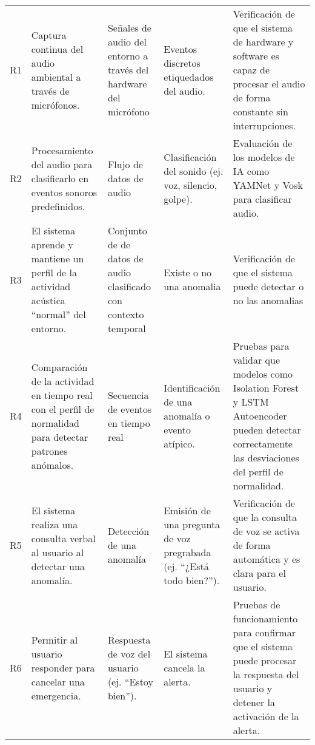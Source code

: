 {\begin{longtable}[c]{c p{3.5cm} p{2.2cm} p{2.2cm} p{3.5cm}}
            R1                     & Captura continua del audio ambiental a través de micrófonos.                                            & Señales de audio del entorno a través del hardware del micrófono & Eventos discretos etiquedados del audio.                                     & Verificación de que el sistema de hardware y software es capaz de procesar el audio de forma constante sin interrupciones.                         \\
            \addlinespace
            R2                     & Procesamiento del audio para clasificarlo en eventos sonoros predefinidos.                              & Flujo de datos de audio                                          & Clasificación del sonido (ej. voz, silencio, golpe).                  & Evaluación de los modelos de IA como YAMNet y Vosk para clasificar audio.                                                  \\
            \addlinespace
            R3                     & El sistema aprende y mantiene un perfil de la actividad acústica ``normal'' del entorno.                & Conjunto de de datos de audio clasificado con contexto temporal                & Existe o no una anomalia& Verificación de que el sistema puede detectar o no las anomalias                                           \\
            \addlinespace
            R4                     & Comparación de la actividad en tiempo real con el perfil de normalidad para detectar patrones anómalos. & Secuencia de eventos en tiempo real             & Identificación de una anomalía o evento atípico.                      & Pruebas para validar que modelos como Isolation Forest y LSTM Autoencoder pueden detectar correctamente las desviaciones del perfil de normalidad. \\
            \addlinespace
            R5                     & El sistema realiza una consulta verbal al usuario al detectar una anomalía.                             & Detección de una anomalía                                        & Emisión de una pregunta de voz pregrabada (ej. ``¿Está todo bien?''). & Verificación de que la consulta de voz se activa de forma automática y es clara para el usuario.                                                   \\
            \addlinespace
            R6                     & Permitir al usuario responder para cancelar una emergencia.                                             & Respuesta de voz del usuario (ej. ``Estoy bien'').               & El sistema cancela la alerta.                                         & Pruebas de funcionamiento para confirmar que el sistema puede procesar la respuesta del usuario y detener la activación de la alerta.              \\

\end{longtable}}
